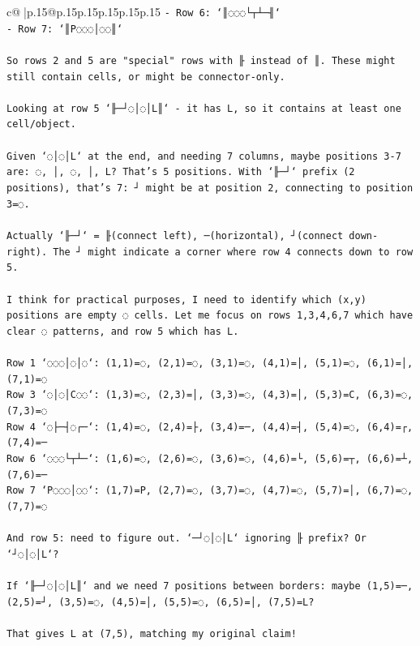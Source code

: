 \documentclass{article}
\begin{document}
{\begin{supertabular}{c@{$\;$}|p{.15\linewidth}@{}p{.15\linewidth}p{.15\linewidth}p{.15\linewidth}p{.15\linewidth}p{.15\linewidth}}
{{{\texttt{{-} Row 6: `║◌◌◌└┬┴─╢`} \\
\texttt{{-} Row 7: `║P◌◌◌│◌◌║`} \\
\\ 
\texttt{So rows 2 and 5 are "special" rows with ╟ instead of ║. These might still contain cells, or might be connector{-}only.} \\
\\ 
\texttt{Looking at row 5 `╟─┘◌│◌│L║` {-} it has L, so it contains at least one cell/object.} \\
\\ 
\texttt{Given `◌│◌│L` at the end, and needing 7 columns, maybe positions 3{-}7 are: ◌, │, ◌, │, L? That's 5 positions. With `╟─┘` prefix (2 positions), that's 7: ┘ might be at position 2, connecting to position 3=◌.} \\
\\ 
\texttt{Actually `╟─┘` = ╟(connect left), ─(horizontal), ┘(connect down{-}right). The ┘ might indicate a corner where row 4 connects down to row 5.} \\
\\ 
\texttt{I think for practical purposes, I need to identify which (x,y) positions are empty ◌ cells. Let me focus on rows 1,3,4,6,7 which have clear ◌ patterns, and row 5 which has L.} \\
\\ 
\texttt{Row 1 `◌◌◌│◌│◌`: (1,1)=◌, (2,1)=◌, (3,1)=◌, (4,1)=│, (5,1)=◌, (6,1)=│, (7,1)=◌} \\
\texttt{Row 3 `◌│◌│C◌◌`: (1,3)=◌, (2,3)=│, (3,3)=◌, (4,3)=│, (5,3)=C, (6,3)=◌, (7,3)=◌} \\
\texttt{Row 4 `◌├─┤◌┌─`: (1,4)=◌, (2,4)=├, (3,4)=─, (4,4)=┤, (5,4)=◌, (6,4)=┌, (7,4)=─} \\
\texttt{Row 6 `◌◌◌└┬┴─`: (1,6)=◌, (2,6)=◌, (3,6)=◌, (4,6)=└, (5,6)=┬, (6,6)=┴, (7,6)=─} \\
\texttt{Row 7 `P◌◌◌│◌◌`: (1,7)=P, (2,7)=◌, (3,7)=◌, (4,7)=◌, (5,7)=│, (6,7)=◌, (7,7)=◌} \\
\\ 
\texttt{And row 5: need to figure out. `─┘◌│◌│L` ignoring ╟ prefix? Or `┘◌│◌│L`? } \\
\\ 
\texttt{If `╟─┘◌│◌│L║` and we need 7 positions between borders: maybe (1,5)=─, (2,5)=┘, (3,5)=◌, (4,5)=│, (5,5)=◌, (6,5)=│, (7,5)=L?} \\
\\ 
\texttt{That gives L at (7,5), matching my original claim!} \\
\\ 
}}}
\end{supertabular}}
\end{document}
